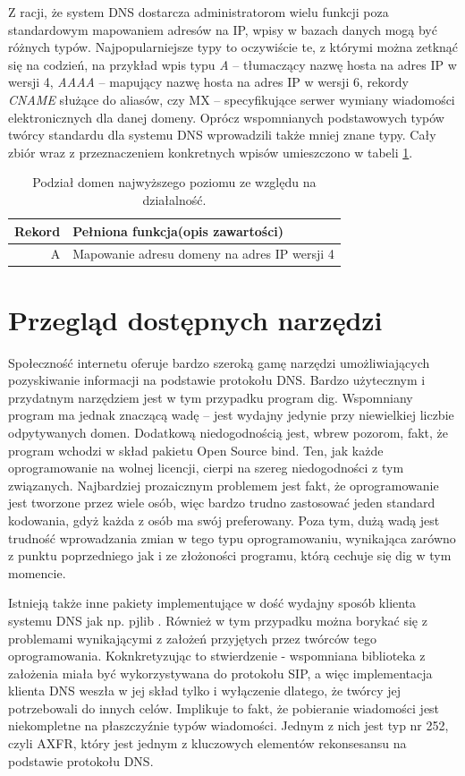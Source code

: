 Z racji, że system DNS dostarcza administratorom wielu funkcji poza standardowym mapowaniem adresów na IP, wpisy w bazach danych mogą być różnych typów. Najpopularniejsze typy to oczywiście te, z którymi można zetknąć się na codzień, na przykład wpis typu \textit{A} -- tłumaczący nazwę hosta na adres IP w wersji 4, \textit{AAAA} -- mapujący nazwę hosta na adres IP w wersji 6, rekordy \textit{CNAME} służące do aliasów, czy MX -- specyfikujące serwer wymiany wiadomości elektronicznych dla danej domeny. Oprócz wspomnianych podstawowych typów twórcy standardu dla systemu DNS wprowadzili także mniej znane typy. Cały zbiór wraz z przeznaczeniem konkretnych wpisów umieszczono w tabeli \ref{typyRekordowDns}.

\begin{table}[]
	\centering
	\caption{Podział domen najwyższego poziomu ze względu na działalność.}
	\label{typyRekordowDns}
	\begin{tabular}{|r|p{10.5cm}|}
		\hline
		\textbf{Rekord} & \textbf{Pełniona funkcja(opis zawartości)} \\
		\hline\hline
		A & Mapowanie adresu domeny na adres IP wersji 4 \\
		\hline
		
	\end{tabular}
\end{table}


\chapter{Przegląd dostępnych narzędzi}
Społeczność internetu oferuje bardzo szeroką gamę narzędzi umożliwiających pozyskiwanie informacji na podstawie protokołu DNS. Bardzo użytecznym i przydatnym narzędziem jest w tym przypadku program dig. Wspomniany program ma jednak znaczącą wadę -- jest wydajny jedynie przy niewielkiej liczbie odpytywanych domen. Dodatkową niedogodnością jest, wbrew pozorom, fakt, że program wchodzi w skład pakietu Open Source bind. Ten, jak każde oprogramowanie na wolnej licencji, cierpi na szereg niedogodności z tym związanych. Najbardziej prozaicznym problemem jest fakt, że oprogramowanie jest tworzone przez wiele osób, więc bardzo trudno zastosować jeden standard kodowania, gdyż każda z osób ma swój preferowany. Poza tym, dużą wadą jest trudność wprowadzania zmian w tego typu oprogramowaniu, wynikająca zarówno z punktu poprzedniego jak i ze złożoności programu, którą cechuje się dig w tym momencie.

Istnieją także inne pakiety implementujące w dość wydajny sposób klienta systemu DNS jak np. pjlib \cite{pjlib}. Również w tym przypadku można borykać się z problemami wynikającymi z założeń przyjętych przez twórców tego oprogramowania. Koknkretyzując to stwierdzenie - wspomniana biblioteka z założenia miała być wykorzystywana do protokołu SIP, a więc implementacja klienta DNS weszła w jej skład tylko i wyłączenie dlatego, że twórcy jej potrzebowali do innych celów. Implikuje to fakt, że pobieranie wiadomości jest niekompletne na płaszczyźnie typów wiadomości. Jednym z nich jest typ nr 252, czyli AXFR, który jest jednym z kluczowych elementów rekonsesansu na podstawie protokołu DNS.